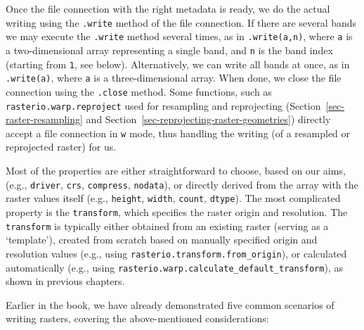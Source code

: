 \documentclass[
  letterpaper,
]{krantz}
\begin{document}
Once the file connection with the right metadata is ready, we do the
actual writing using the \texttt{.write} method of the file connection.
If there are several bands we may execute the \texttt{.write} method
several times, as in \texttt{.write(a,n)}, where \texttt{a} is a
two-dimensional array representing a single band, and \texttt{n} is the
band index (starting from \texttt{1}, see below). Alternatively, we can
write all bands at once, as in \texttt{.write(a)}, where \texttt{a} is a
three-dimensional array. When done, we close the file connection using
the \texttt{.close} method. Some functions, such as
\texttt{rasterio.warp.reproject} used for resampling and reprojecting
(Section~\ref{sec-raster-resampling} and
Section~\ref{sec-reprojecting-raster-geometries}) directly accept a file
connection in \texttt{\textquotesingle{}w\textquotesingle{}} mode, thus
handling the writing (of a resampled or reprojected raster) for us.

Most of the properties are either straightforward to choose, based on
our aims, (e.g., \texttt{driver}, \texttt{crs}, \texttt{compress},
\texttt{nodata}), or directly derived from the array with the raster
values itself (e.g., \texttt{height}, \texttt{width}, \texttt{count},
\texttt{dtype}). The most complicated property is the
\texttt{transform}, which specifies the raster origin and resolution.
The \texttt{transform} is typically either obtained from an existing
raster (serving as a `template'), created from scratch based on manually
specified origin and resolution values (e.g., using
\texttt{rasterio.transform.from\_origin}), or calculated automatically
(e.g., using \texttt{rasterio.warp.calculate\_default\_transform}), as
shown in previous chapters.

Earlier in the book, we have already demonstrated five common scenarios
of writing rasters, covering the above-mentioned considerations:
\end{document}
